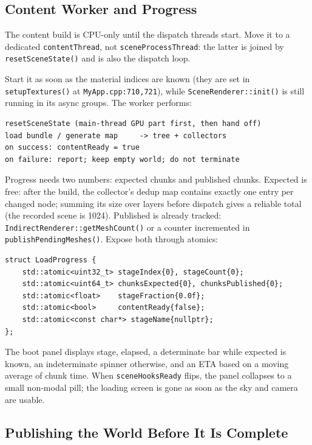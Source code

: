 \documentclass[11pt,a4paper]{article}
\begin{document}
\subsection{Content Worker and Progress}

The content build is CPU-only until the dispatch threads start. Move it to a
dedicated \texttt{contentThread}, not \texttt{sceneProcessThread}: the latter
is joined by \texttt{resetSceneState()} and is also the dispatch loop.

Start it as soon as the material indices are known (they are set in
\texttt{setupTextures()} at \texttt{MyApp.cpp:710,721}), while
\texttt{SceneRenderer::init()} is still running in its async groups. The
worker performs:

\begin{lstlisting}
resetSceneState (main-thread GPU part first, then hand off)
load bundle / generate map     -> tree + collectors
on success: contentReady = true
on failure: report; keep empty world; do not terminate
\end{lstlisting}

Progress needs two numbers: expected chunks and published chunks. Expected is
free: after the build, the collector's dedup map contains exactly one entry
per changed node; summing its size over layers before dispatch gives a
reliable total (the recorded scene is 1024). Published is already tracked:
\texttt{IndirectRenderer::getMeshCount()} or a counter incremented in
\texttt{publishPendingMeshes()}. Expose both through atomics:

\begin{lstlisting}
struct LoadProgress {
    std::atomic<uint32_t> stageIndex{0}, stageCount{0};
    std::atomic<uint64_t> chunksExpected{0}, chunksPublished{0};
    std::atomic<float>    stageFraction{0.0f};
    std::atomic<bool>     contentReady{false};
    std::atomic<const char*> stageName{nullptr};
};
\end{lstlisting}

The boot panel displays stage, elapsed, a determinate bar while expected is
known, an indeterminate spinner otherwise, and an ETA based on a moving
average of chunk time. When \texttt{sceneHooksReady} flips, the panel
collapses to a small non-modal pill; the loading screen is gone as soon as
the sky and camera are usable.

\subsection{Publishing the World Before It Is Complete}
\end{document}
